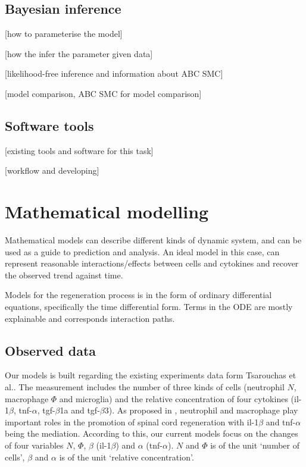 \documentclass[12pt,a4paper]{report}
\begin{document}
\section{Bayesian inference}

[how to parameterise the model]

[how the infer the parameter given data]

[likelihood-free inference and information about ABC SMC]

[model comparison, ABC SMC for model comparison]

\section{Software tools}

[existing tools and software for this task]

[workflow and developing]

\chapter{Mathematical modelling}

Mathematical models can describe different kinds of dynamic system, and can be used as a guide to prediction and analysis. An ideal model in this case, can represent reasonable interactions/effects between cells and cytokines and recover the observed  trend against time. 

Models for the regeneration process is in the form of ordinary differential equations, specifically the time differential form. Terms in the ODE are mostly explainable and corresponds interaction paths. 

\section{Observed data}

Our models is built regarding the existing experiments data form Tsarouchas et al.\cite{ref:Tsarouchas}. The measurement includes the number of three kinds of cells (neutrophil $N$, macrophage $\Phi$ and microglia) and the relative concentration of four cytokines (il-1$\beta$, tnf-$\alpha$, tgf-$\beta$1a and tgf-$\beta$3). As proposed in \cite{ref:Tsarouchas}, neutrophil and macrophage play important roles in the promotion of spinal cord regeneration with il-1$\beta$ and tnf-$\alpha$ being the mediation. According to this, our current models focus on the changes of four variables $N$, $\Phi $, $\beta$ (il-1$\beta$) and $\alpha$ (tnf-$\alpha$). $N$ and $\Phi$ is of the unit `number of cells', $\beta$ and $\alpha$ is of the unit `relative concentration'.
\end{document}
